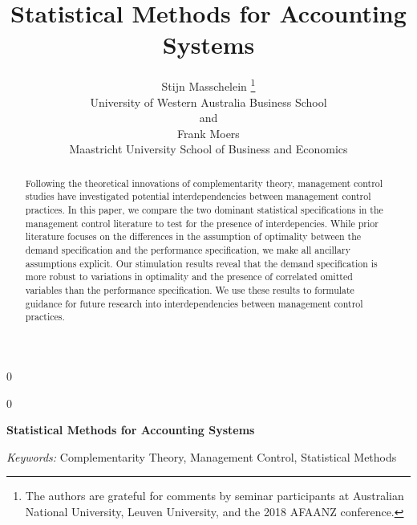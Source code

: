 \documentclass[12pt]{article}
\newcommand{\blind}{0}
\begin{document}
\def\spacingset#1{\renewcommand{\baselinestretch}%
{#1}\small\normalsize} \spacingset{1}


\blind
{
  \title{\bf Statistical Methods for Accounting Systems}

  \author{
        Stijn Masschelein \thanks{The authors are grateful for comments by seminar participants at
Australian National University, Leuven University, and the 2018 AFAANZ
conference.} \\
    University of Western Australia Business School\\
     and \\     Frank Moers \\
    Maastricht University School of Business and Economics\\
      }
  \maketitle
} \fi

\blind
{
  \bigskip
  \bigskip
  \bigskip
  \begin{center}
    {\LARGE\bf Statistical Methods for Accounting Systems}
  \end{center}
  \medskip
} \fi

\bigskip
\begin{abstract}
Following the theoretical innovations of complementarity theory,
management control studies have investigated potential interdependencies
between management control practices. In this paper, we compare the two
dominant statistical specifications in the management control literature
to test for the presence of interdepencies. While prior literature
focuses on the differences in the assumption of optimality between the
demand specification and the performance specification, we make all
ancillary assumptions explicit. Our stimulation results reveal that the
demand specification is more robust to variations in optimality and the
presence of correlated omitted variables than the performance
specification. We use these results to formulate guidance for future
research into interdependencies between management control practices.
\end{abstract}

\noindent%
{\it Keywords:} Complementarity Theory, Management Control, Statistical Methods
\vfill

\newpage

\spacingset{1.15}
\end{document}
